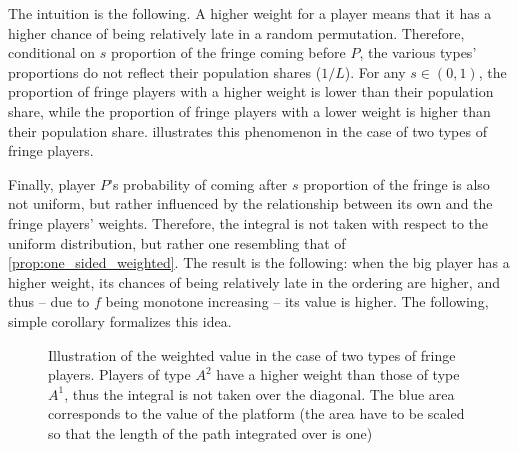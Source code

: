 \documentclass[a4paper]{article}
\begin{document}
The intuition is the following.
A higher weight for a player means that it has a higher chance of being relatively late in a random permutation.
Therefore, conditional on $s$ proportion of the fringe coming before $P$, the various types' proportions do not reflect their population shares ($1/L$).
For any $s \in (0, 1)$, the proportion of fringe players with a higher weight is lower than their population share, while the proportion of fringe players with a lower weight is higher than their population share.
 illustrates this phenomenon in the case of two types of fringe players.

Finally, player $P$'s probability of coming after $s$ proportion of the fringe is also not uniform, but rather influenced by the relationship between its own and the fringe players' weights.
Therefore, the integral is not taken with respect to the uniform distribution, but rather one resembling that of \cref{prop:one_sided_weighted}.
The result is the following: when the big player has a higher weight, its chances of being relatively late in the ordering are higher, and thus -- due to $f$ being monotone increasing -- its value is higher.
The following, simple corollary formalizes this idea.





\begin{figure}
    \centering
    \caption{Illustration of the weighted value in the case of two types of fringe players. Players of type $A^2$ have a higher weight than those of type $A^1$, thus the integral is not taken over the diagonal. The blue area corresponds to the value of the platform (the area have to be scaled so that the length of the path integrated over is one)}
    \label{fig:many_sided_weighted}
\end{figure}
\end{document}
